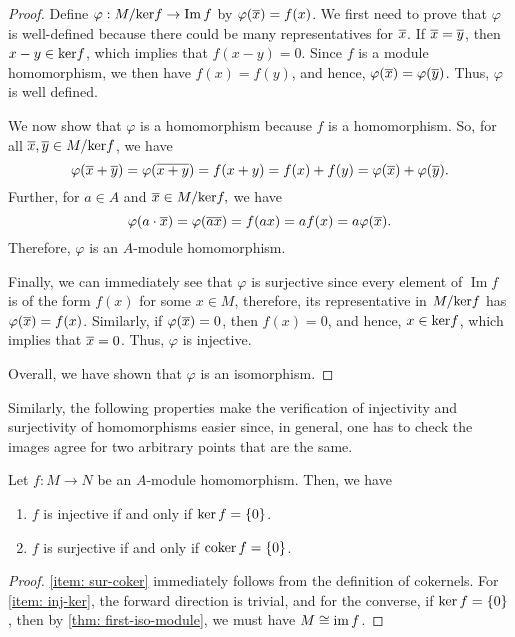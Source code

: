 \begin{proof}
    Define $\varphi: M / {\operatorname{\text{ker\/}}} f \rightarrow \operatorname{Im} f$ by $\varphi(\overline{x})=f(x)$. We first need to prove that $\varphi$ is well-defined because there could be many representatives for $\overline{x}$. If $\overline{x}=\overline{y}$, then $x-y \in {\operatorname{\text{ker\/}}} f$, which implies that $f(x-y)=0$. Since $f$ is a module homomorphism, we then have $f(x)=f(y)$, and hence, $\varphi(\overline{x})=\varphi(\overline{y})$. Thus, $\varphi$ is well defined.
    
    We now show that $\varphi$ is a homomorphism because $f$ is a homomorphism. So, for all $\overline{x}, \overline{y} \in M / {\operatorname{\text{ker\/}}} f$, we have
    \[ \varphi(\overline{x}+\overline{y})=\varphi(\overline{x+y})=f(x+y)=f(x)+f(y)=\varphi(\overline{x})+\varphi(\overline{y}).
    \]
    Further, for $a \in A$ and $\overline{x} \in M / {\operatorname{\text{ker\/}}} f,$ we have 
    \[\varphi(a \cdot \overline{x})=\varphi(\overline{a x})=f(a x)=a f(x)=a \varphi(\overline{x}).\]
    Therefore, $\varphi$ is an $A$-module homomorphism.
    
    Finally, we can immediately see that $\varphi$ is surjective since every element of $\operatorname{Im} f$ is of the form $f(x)$ for some $x \in M$, therefore, its representative in $M / {\operatorname{\text{ker\/}}} f$ has $\varphi(\overline{x}) = f(x)$. Similarly, if $\varphi(\overline{x})=0$, then $f(x)=0$, and hence, $x \in {\operatorname{\text{ker\/}}} f$, which implies that $\overline{x}=0$. Thus, $\varphi$ is injective.
    
    Overall, we have shown that $\varphi$ is an isomorphism.
\end{proof}
 
 Similarly, the following properties make the verification of injectivity and surjectivity of homomorphisms easier since, in general, one has to check the images agree for two arbitrary points that are the same.
\begin{proposition}\label{prop: inj-sur-homo}
     Let $f: M \rightarrow N$ be an $A$-module homomorphism. Then, we have
     \begin{enumerate}
         \item \label{item: inj-ker} $f$ is injective if and only if $\operatorname{\text{ker\/}}{f}=\{0\}$.
         \item \label{item: sur-coker} $f$ is surjective if and only if $\operatorname{\text{coker\/}}{f}=\{0\}$.
     \end{enumerate}
\end{proposition}
\begin{proof}
    \eqref{item: sur-coker} immediately follows from the definition of cokernels. For \eqref{item: inj-ker}, the forward direction is trivial, and for the converse, if $\operatorname{\text{ker\/}}{f}=\{0\}$, then by \cref{thm: first-iso-module}, we must have $M \cong \operatorname{\text{im\/}}{f}$.
\end{proof}

